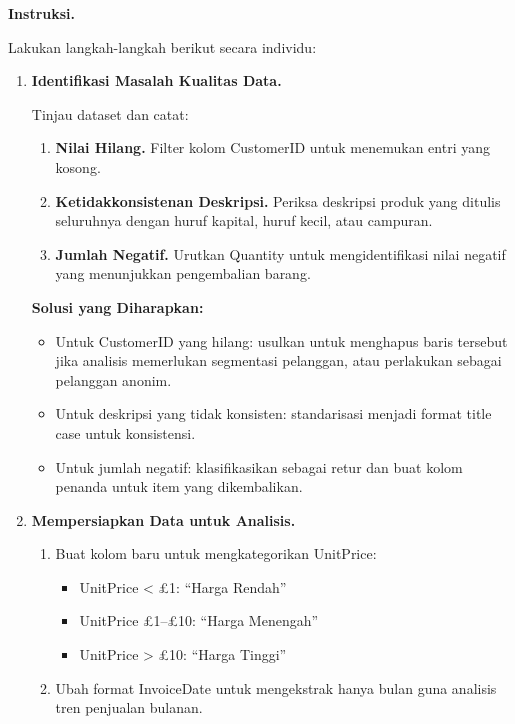 \textbf{Instruksi.}

Lakukan langkah-langkah berikut secara individu:

\begin{enumerate}
	\item \textbf{Identifikasi Masalah Kualitas Data.}
	
	Tinjau dataset dan catat:
	
	\begin{enumerate}
		\item \textbf{Nilai Hilang.} Filter kolom CustomerID untuk menemukan entri yang kosong.
		\item \textbf{Ketidakkonsistenan Deskripsi.} Periksa deskripsi produk yang ditulis seluruhnya dengan huruf kapital, huruf kecil, atau campuran.
		\item \textbf{Jumlah Negatif.} Urutkan Quantity untuk mengidentifikasi nilai negatif yang menunjukkan pengembalian barang.
	\end{enumerate}
	
	\textbf{Solusi yang Diharapkan:}
	
	\begin{itemize}
		\item Untuk CustomerID yang hilang: usulkan untuk menghapus baris tersebut jika analisis memerlukan segmentasi pelanggan, atau perlakukan sebagai pelanggan anonim.
		\item Untuk deskripsi yang tidak konsisten: standarisasi menjadi format title case untuk konsistensi.
		\item Untuk jumlah negatif: klasifikasikan sebagai retur dan buat kolom penanda untuk item yang dikembalikan.
	\end{itemize}
	
	\item \textbf{Mempersiapkan Data untuk Analisis.}
	
	\begin{enumerate}
		\item Buat kolom baru untuk mengkategorikan UnitPrice:
		\begin{itemize}
			\item UnitPrice < £1: “Harga Rendah”
			\item UnitPrice £1–£10: “Harga Menengah”
			\item UnitPrice > £10: “Harga Tinggi”
		\end{itemize}
		\item Ubah format InvoiceDate untuk mengekstrak hanya bulan guna analisis tren penjualan bulanan.
	\end{enumerate}
	

\end{enumerate}
